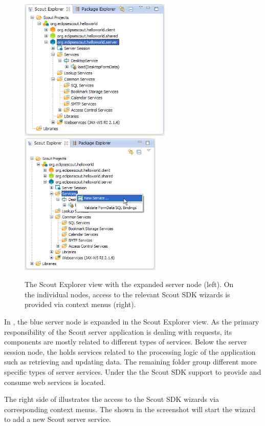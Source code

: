 \documentclass[a4paper,10pt,twoside]{book}
\begin{document}
\begin{figure}
\includegraphics[height=6.8cm]{explorer_server.png} \hspace{5mm} 
\includegraphics[height=6.8cm]{explorer_server_servicewizard.png}
\caption{The Scout Explorer view with the expanded server node (left). On the individual nodes, access to the relevant Scout SDK wizards is provided via context menus (right).}
\end{figure}

In , the blue server node is expanded in the Scout Explorer view. 
As the primary responsibility of the Scout server application is dealing with requests, its components are mostly related to different types of services. 
Below the server session node, the  holds services related to the processing logic of the application such as retrieving and updating data. 
The remaining folder group different more specific types of server services. 
Under the  the Scout SDK support to provide and consume web services is located. 

The right side of  illustrates the access to the Scout SDK wizards via corresponding context menus. 
The  shown in the screenshot will start the wizard to add a new Scout server service. 
 
\end{document}
